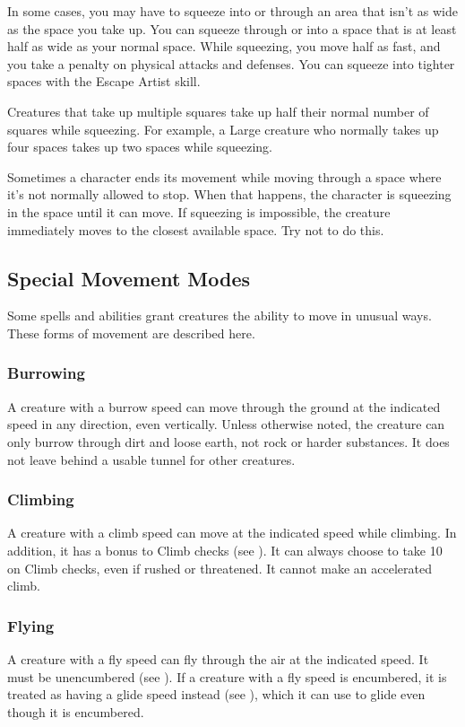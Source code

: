 In some cases, you may have to squeeze into or through an area that isn't as wide as the space you take up. You can squeeze through or into a space that is at least half as wide as your normal space. While squeezing, you move half as fast, and you take a  penalty on physical attacks and defenses. You can squeeze into tighter spaces with the Escape Artist skill.

Creatures that take up multiple squares take up half their normal number of squares while squeezing. For example, a Large creature who normally takes up four spaces takes up two spaces while squeezing.

 Sometimes a character ends its movement while moving through a space where it's not normally allowed to stop. When that happens, the character is squeezing in the space until it can move. If squeezing is impossible, the creature immediately moves to the closest available space. Try not to do this.

\subsection{Special Movement Modes}\label{Special Movement Modes}
Some spells and abilities grant creatures the ability to move in unusual ways. These forms of movement are described here.

\subsubsection{Burrowing}\label{Burrowing}
A creature with a burrow speed can move through the ground at the indicated speed in any direction, even vertically. Unless otherwise noted, the creature can only burrow through dirt and loose earth, not rock or harder substances. It does not leave behind a usable tunnel for other creatures. 

\subsubsection{Climbing}\label{Climbing}
A creature with a climb speed can move at the indicated speed while climbing. In addition, it has a  bonus to Climb checks (see ). It can always choose to take 10 on Climb checks, even if rushed or threatened. It cannot make an accelerated climb. 

\subsubsection{Flying}\label{Flying}
A creature with a fly speed can fly through the air at the indicated speed. It must be unencumbered (see ). If a creature with a fly speed is encumbered, it is treated as having a glide speed instead (see ), which it can use to glide even though it is encumbered.

